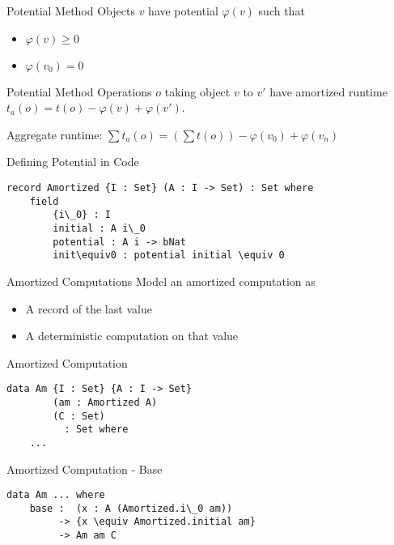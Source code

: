 \documentclass[11pt]{beamer}
\begin{document}
    \begin{frame}{Potential Method}
        Objects $v$ have potential $\varphi(v)$ such that

        \begin{itemize}
            \item $\varphi(v) \geq 0$
            \item $\varphi(v_0) = 0$
        \end{itemize}
    \end{frame}

    \begin{frame}{Potential Method}
        Operations $o$ taking object $v$ to $v'$ have amortized runtime $t_a(o) = t(o) - \varphi(v) + \varphi(v')$.

        Aggregate runtime: $\sum t_a(o) = (\sum t(o)) - \varphi(v_0) + \varphi(v_n)$
    \end{frame}

    \begin{frame}[fragile]{Defining Potential in Code}
        \begin{lstlisting}[emph={Amortized}]
record Amortized {I : Set} (A : I -> Set) : Set where
    field
        {i\_0} : I
        initial : A i\_0
        potential : A i -> bNat
        init\equiv0 : potential initial \equiv 0
        \end{lstlisting}
    \end{frame}

    \begin{frame}{Amortized Computations}
        Model an amortized computation as

        \begin{itemize}
            \item A record of the last value
            \item A deterministic computation on that value
        \end{itemize}
    \end{frame}

    \begin{frame}[fragile]{Amortized Computation}
        \begin{lstlisting}[emph={Am,Amortized}]
data Am {I : Set} {A : I -> Set}
        (am : Amortized A)
        (C : Set)
          : Set where
    ...
        \end{lstlisting}
    \end{frame}

    \begin{frame}[fragile]{Amortized Computation - Base}
        \begin{lstlisting}[emph={Am,base}]
data Am ... where
    base :  (x : A (Amortized.i\_0 am))
         -> {x \equiv Amortized.initial am}
         -> Am am C
        \end{lstlisting}
    \end{frame}
\end{document}
